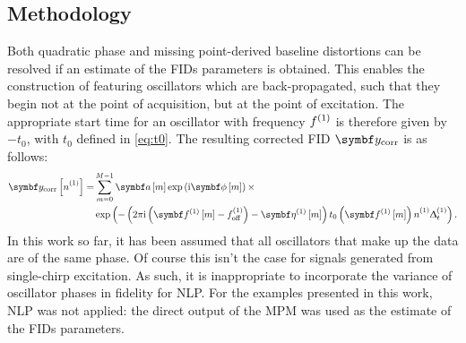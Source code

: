 \subsection{Methodology}
Both quadratic phase and missing point-derived baseline distortions can be
resolved if an estimate of the \acp{FID} parameters is obtained. This enables
the construction of  featuring oscillators which
are back-propagated, such that they begin not at the point of acquisition, but
at the point of excitation. The appropriate start time for an oscillator with
frequency $f^{(1)}$ is therefore given by $-t_0$, with  $t_0$
defined in \eqref{eq:t0}. The resulting corrected \ac{FID} $\by_{\text{corr}}$
is as follows:
\begin{equation}
    \begin{split}
        \by_{\text{corr}} \left[ \none \right] =
            &\sum_{m=0}^{M-1} \bdam \exp \left( \iu \bdphim \right) \times \\
            &\exp\left(-
            \left(2 \pi \iu \left(\bdfonem - \foffone \right) - \bdetaonem \right)
            t_0 \left(\bdfonem\right) \none \Dtone
            \right).
    \end{split}
\end{equation}
In this work so far, it has been assumed that all oscillators that make up the
data are of the same phase. Of course this isn't the case for signals
generated from single-chirp excitation. As such, it is inappropriate to
incorporate the variance of oscillator phases in fidelity for \ac{NLP}.
For the examples presented in this work, \ac{NLP} was not applied: the direct
output of the \ac{MPM} was used as the estimate of the \acp{FID} parameters.

